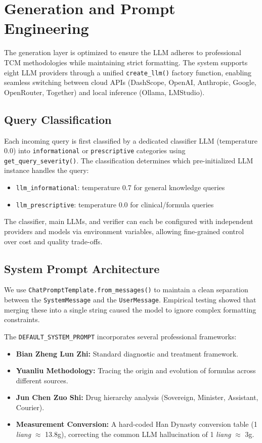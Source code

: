\section{Generation and Prompt Engineering}

The generation layer is optimized to ensure the LLM adheres to professional TCM methodologies while maintaining strict formatting. The system supports eight LLM providers through a unified \texttt{create\_llm()} factory function, enabling seamless switching between cloud APIs (DashScope, OpenAI, Anthropic, Google, OpenRouter, Together) and local inference (Ollama, LMStudio).

\subsection{Query Classification}
Each incoming query is first classified by a dedicated classifier LLM (temperature 0.0) into \texttt{informational} or \texttt{prescriptive} categories using \texttt{get\_query\_severity()}. The classification determines which pre-initialized LLM instance handles the query:

\begin{itemize}
    \item \texttt{llm\_informational}: temperature 0.7 for general knowledge queries
    \item \texttt{llm\_prescriptive}: temperature 0.0 for clinical/formula queries
\end{itemize}

The classifier, main LLMs, and verifier can each be configured with independent providers and models via environment variables, allowing fine-grained control over cost and quality trade-offs.

\subsection{System Prompt Architecture}
We use \texttt{ChatPromptTemplate.from\_messages()} to maintain a clean separation between the \texttt{SystemMessage} and the \texttt{UserMessage}. Empirical testing showed that merging these into a single string caused the model to ignore complex formatting constraints.

The \texttt{DEFAULT\_SYSTEM\_PROMPT} incorporates several professional frameworks:
\begin{itemize}
    \item \textbf{Bian Zheng Lun Zhi:} Standard diagnostic and treatment framework.
    \item \textbf{Yuanliu Methodology:} Tracing the origin and evolution of formulas across different sources.
    \item \textbf{Jun Chen Zuo Shi:} Drug hierarchy analysis (Sovereign, Minister, Assistant, Courier).
    \item \textbf{Measurement Conversion:} A hard-coded Han Dynasty conversion table (1 \textit{liang} $\approx$ 13.8g), correcting the common LLM hallucination of 1 \textit{liang} $\approx$ 3g.
\end{itemize}


